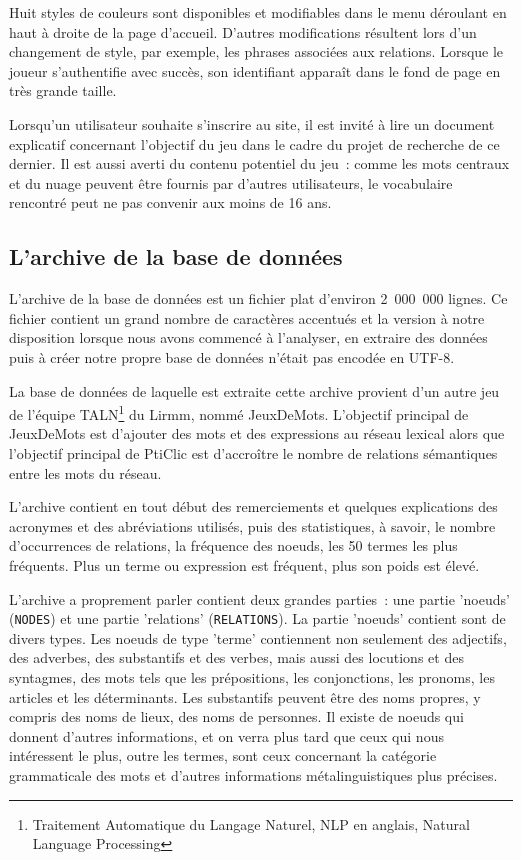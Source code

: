\documentclass[a4paper,11pt,french]{article}
\begin{document}
Huit styles de couleurs sont disponibles et modifiables dans le menu déroulant en haut à droite de la page d'accueil. D'autres modifications résultent lors d'un changement de style, par exemple, les phrases associées aux relations. Lorsque le joueur s'authentifie avec succès, son identifiant apparaît dans le fond de page en très grande taille.

Lorsqu'un utilisateur souhaite s'inscrire au site, il est invité à lire un document explicatif concernant l'objectif du jeu dans le cadre du projet
de recherche de ce dernier. Il est aussi averti du contenu potentiel du jeu~: comme les mots centraux et du nuage peuvent être fournis par d'autres
utilisateurs, le vocabulaire rencontré peut ne pas convenir aux moins de 16 ans.



\subsection{L'archive de la base de données}

L'archive de la base de données est un fichier plat d'environ 2~000~000 lignes. Ce fichier contient un grand nombre de caractères accentués et
la version à notre disposition lorsque nous avons commencé à l'analyser, en extraire des données puis à créer notre propre base de données
n'était pas encodée en UTF-8.

La base de données de laquelle est extraite cette archive provient d'un autre jeu de l'équipe TALN\footnote{Traitement Automatique du Langage Naturel, NLP en anglais, Natural Language Processing} du Lirmm, nommé JeuxDeMots. L'objectif principal de JeuxDeMots est d'ajouter des mots et des expressions au réseau lexical alors que l'objectif principal de PtiClic est d'accroître le nombre de relations sémantiques entre les mots du réseau.

L'archive contient en tout début des remerciements et quelques explications des acronymes et des abréviations utilisés, puis des statistiques, à savoir, le nombre d'occurrences de relations, la fréquence des noeuds, les 50 termes les plus fréquents. Plus un terme ou expression est fréquent, plus son poids est élevé. 

L'archive a proprement parler contient deux grandes parties~: une partie 'noeuds' (\verb!NODES!) et une partie 'relations' (\verb!RELATIONS!). La partie 'noeuds'  contient sont de divers types. Les noeuds de type 'terme' contiennent non seulement des adjectifs, des adverbes, des substantifs et des verbes, mais aussi des locutions et des syntagmes, des mots tels que les prépositions, les conjonctions, les pronoms, les articles et les déterminants. Les substantifs peuvent être des noms propres, y compris des noms de lieux, des noms de personnes. Il existe de noeuds qui donnent d'autres informations, et on verra plus tard que ceux qui nous intéressent le plus, outre les termes, sont ceux concernant la catégorie grammaticale des mots et d'autres informations métalinguistiques plus précises.
\end{document}
